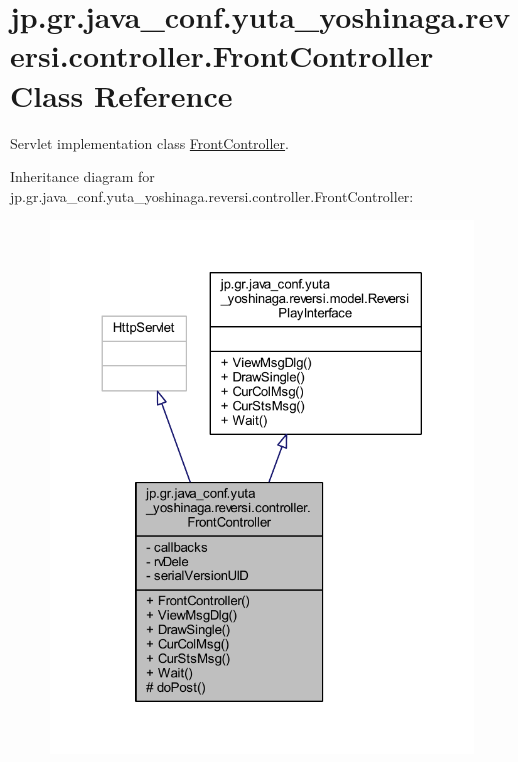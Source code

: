 \hypertarget{classjp_1_1gr_1_1java__conf_1_1yuta__yoshinaga_1_1reversi_1_1controller_1_1_front_controller}{}\section{jp.\+gr.\+java\+\_\+conf.\+yuta\+\_\+yoshinaga.\+reversi.\+controller.\+Front\+Controller Class Reference}
\label{classjp_1_1gr_1_1java__conf_1_1yuta__yoshinaga_1_1reversi_1_1controller_1_1_front_controller}


Servlet implementation class \hyperlink{classjp_1_1gr_1_1java__conf_1_1yuta__yoshinaga_1_1reversi_1_1controller_1_1_front_controller}{Front\+Controller}.  




Inheritance diagram for jp.\+gr.\+java\+\_\+conf.\+yuta\+\_\+yoshinaga.\+reversi.\+controller.\+Front\+Controller\+:
\nopagebreak
\begin{figure}[H]
\begin{center}
\leavevmode
\includegraphics[width=324pt]{classjp_1_1gr_1_1java__conf_1_1yuta__yoshinaga_1_1reversi_1_1controller_1_1_front_controller__inherit__graph}
\end{center}
\end{figure}



